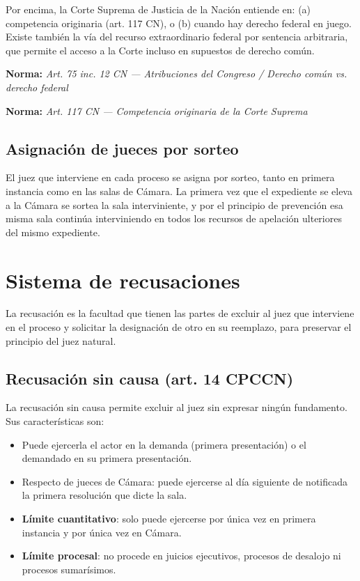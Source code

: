 \documentclass[12pt,oneside]{book}
\newcommand{\norma}[1]{%
\par\noindent\textbf{Norma:} \textit{#1}\par\smallskip
}
\begin{document}
Por encima, la Corte Suprema de Justicia de la Nación entiende en: (a) competencia originaria (art. 117 CN), o (b) cuando hay derecho federal en juego. Existe también la vía del recurso extraordinario federal por sentencia arbitraria, que permite el acceso a la Corte incluso en supuestos de derecho común.

\norma{Art. 75 inc. 12 CN --- Atribuciones del Congreso / Derecho común vs. derecho federal}
\norma{Art. 117 CN --- Competencia originaria de la Corte Suprema}

\subsection{Asignación de jueces por sorteo}

El juez que interviene en cada proceso se asigna por sorteo, tanto en primera instancia como en las salas de Cámara. La primera vez que el expediente se eleva a la Cámara se sortea la sala interviniente, y por el principio de prevención esa misma sala continúa interviniendo en todos los recursos de apelación ulteriores del mismo expediente.

\section{Sistema de recusaciones}

La recusación es la facultad que tienen las partes de excluir al juez que interviene en el proceso y solicitar la designación de otro en su reemplazo, para preservar el principio del juez natural.

\subsection{Recusación sin causa (art. 14 CPCCN)}

La recusación sin causa permite excluir al juez sin expresar ningún fundamento. Sus características son:

\begin{itemize}
    \item Puede ejercerla el actor en la demanda (primera presentación) o el demandado en su primera presentación.
    \item Respecto de jueces de Cámara: puede ejercerse al día siguiente de notificada la primera resolución que dicte la sala.
    \item \textbf{Límite cuantitativo}: solo puede ejercerse por única vez en primera instancia y por única vez en Cámara.
    \item \textbf{Límite procesal}: no procede en juicios ejecutivos, procesos de desalojo ni procesos sumarísimos.
\end{itemize}
\end{document}
